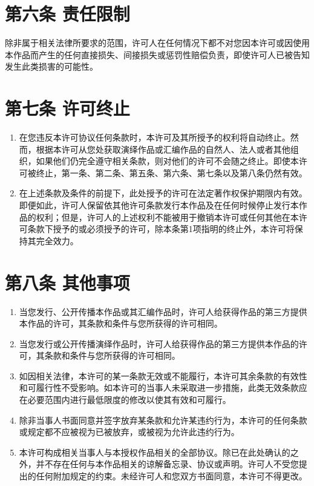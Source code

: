 \section{第六条 责任限制}
除非属于相关法律所要求的范围，许可人在任何情况下都不对您因本许可或因使用本作品而产生的任何直接损失、间接损失或惩罚性赔偿负责，即使许可人已被告知发生此类损害的可能性。 
\section{第七条 许可终止}
\begin{enumerate}
	\item 在您违反本许可协议任何条款时，本许可及其所授予的权利将自动终止。然而，根据本许可从您处获取演绎作品或汇编作品的自然人、法人或者其他组织，如果他们仍完全遵守相关条款，则对他们的许可不会随之终止。即使本许可被终止，第一条、第二条、第五条、第六条、第七条以及第八条仍然有效。
	\item 在上述条款及条件的前提下，此处授予的许可在法定著作权保护期限内有效。即便如此，许可人保留依其他许可条款发行本作品及在任何时候停止发行本作品的权利；但是，许可人的上述权利不能被用于撤销本许可或任何其他在本许可条款下授予的或必须授予的许可，除本条第1项指明的终止外，本许可将保持其完全效力。
\end{enumerate}
\section{第八条 其他事项}
\begin{enumerate}
	\item 当您发行、公开传播本作品或其汇编作品时，许可人给获得作品的第三方提供本作品的许可，其条款和条件与您所获得的许可相同。
	\item 当您发行或公开传播演绎作品时，许可人给获得作品的第三方提供本作品的许可，其条款和条件与您所获得的许可相同。
	\item 如因相关法律，本许可的某一条款无效或不能履行，本许可其余条款的有效性和可履行性不受影响。如本许可的当事人未采取进一步措施，此类无效条款应在必要范围内进行最低限度的修改以使其有效和可履行。
	\item 除非当事人书面同意并签字放弃某条款和允许某违约行为，本许可的任何条款或规定都不应被视为已被放弃，或被视为允许此违约行为。
	\item 本许可构成相关当事人与本授权作品相关的全部协议。除已在此处确认的之外，并不存在任何与本作品相关的谅解备忘录、协议或声明。许可人不受您提出的任何附加规定的约束。未经许可人和您双方书面同意，本许可不得更改。
\end{enumerate}
